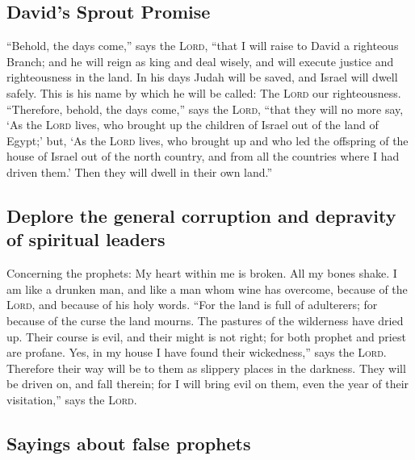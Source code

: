 \hypertarget{davids-sprout-promise}{%
\subsection{David's Sprout Promise}\label{davids-sprout-promise}}

 ``Behold, the days come,'' says the \textsc{Lord}, ``that
I will raise to David a righteous Branch; and he will reign as king and
deal wisely, and will execute justice and righteousness in the land.
 In his days Judah will be saved, and Israel will dwell
safely. This is his name by which he will be called: The \textsc{Lord}
our righteousness.  ``Therefore, behold, the days come,''
says the \textsc{Lord}, ``that they will no more say, `As the
\textsc{Lord} lives, who brought up the children of Israel out of the
land of Egypt;'  but, `As the \textsc{Lord} lives, who
brought up and who led the offspring of the house of Israel out of the
north country, and from all the countries where I had driven them.' Then
they will dwell in their own land.''

\hypertarget{deplore-the-general-corruption-and-depravity-of-spiritual-leaders}{%
\subsection{Deplore the general corruption and depravity of spiritual
leaders}\label{deplore-the-general-corruption-and-depravity-of-spiritual-leaders}}

 Concerning the prophets: My heart within me is broken.
All my bones shake. I am like a drunken man, and like a man whom wine
has overcome, because of the \textsc{Lord}, and because of his holy
words.  ``For the land is full of adulterers; for because
of the curse the land mourns. The pastures of the wilderness have dried
up. Their course is evil, and their might is not right; 
for both prophet and priest are profane. Yes, in my house I have found
their wickedness,'' says the \textsc{Lord}.  Therefore
their way will be to them as slippery places in the darkness. They will
be driven on, and fall therein; for I will bring evil on them, even the
year of their visitation,'' says the \textsc{Lord}.

\hypertarget{sayings-about-false-prophets}{%
\subsection{Sayings about false
prophets}\label{sayings-about-false-prophets}}

